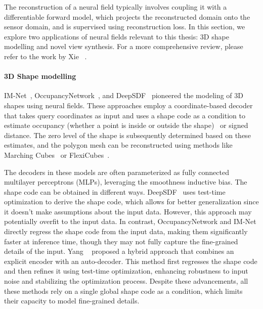 The reconstruction of a neural field typically involves coupling it with a differentiable forward model, which projects the reconstructed domain onto the sensor domain, and is supervised using reconstruction loss. In this section, we explore two applications of neural fields relevant to this thesis: 3D shape modelling and novel view synthesis. For a more comprehensive review, please refer to the work by Xie \etal~\cite{xie2022neural}.

\paragraph{3D Shape modelling}
IM-Net~\cite{chen2019learning}, OccupancyNetwork~\cite{mescheder2019occupancy}, and DeepSDF~\cite{park2019deepsdf} pioneered the modeling of 3D shapes using neural fields. These approaches employ a coordinate-based decoder that takes query coordinates as input and uses a shape code as a condition to estimate occupancy (whether a point is inside or outside the shape)~\cite{mescheder2019occupancy, chen2019learning} or signed distance\cite{park2019deepsdf}. The zero level of the shape is subsequently determined based on these estimates, and the polygon mesh can be reconstructed using methods like Marching Cubes~\cite{levoy1990efficient} or FlexiCubes~\cite{shen2023flexible}.

The decoders in these models are often parameterized as fully connected multilayer perceptrons (MLPs), leveraging the smoothness inductive bias. The shape code can be obtained in different ways. DeepSDF~\cite{park2019deepsdf} uses test-time optimization to derive the shape code, which allows for better generalization since it doesn't make assumptions about the input data. However, this approach may potentially overfit to the input data. In contrast, OccupancyNetwork and IM-Net directly regress the shape code from the input data, making them significantly faster at inference time, though they may not fully capture the fine-grained details of the input. Yang \etal~\cite{yang2023reconstructing} proposed a hybrid approach that combines an explicit encoder with an auto-decoder. This method first regresses the shape code and then refines it using test-time optimization, enhancing robustness to input noise and stabilizing the optimization process. Despite these advancements, all these methods rely on a single global shape code as a condition, which limits their capacity to model fine-grained details.

